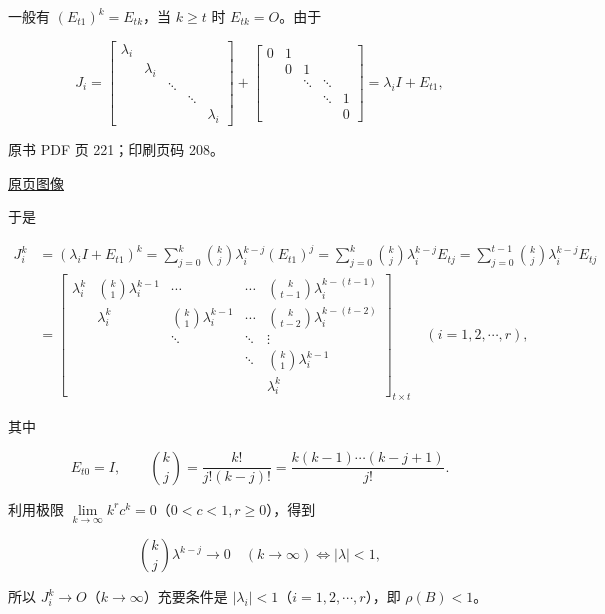 一般有 \((E_{t1})^k=E_{tk}\)，当 \(k\geqslant t\) 时 \(E_{tk}=O\)。由于

\[
J_i=\begin{bmatrix}
\lambda_i&&&&\\
&\lambda_i&&&\\
&&\ddots&&\\
&&&\ddots&\\
&&&&\lambda_i
\end{bmatrix}
+\begin{bmatrix}
0&1&&&\\
&0&1&&\\
&&\ddots&\ddots&\\
&&&\ddots&1\\
&&&&0
\end{bmatrix}
=\lambda_i I+E_{t1},
\]

\clearpage

原书 PDF 页 221；印刷页码 208。

\href{source-images/pdf-221.jpeg}{原页图像}

于是

\[
\begin{aligned}
J_i^k&=(\lambda_i I+E_{t1})^k
=\sum_{j=0}^k\binom{k}{j}\lambda_i^{k-j}(E_{t1})^j
=\sum_{j=0}^k\binom{k}{j}\lambda_i^{k-j}E_{tj}
=\sum_{j=0}^{t-1}\binom{k}{j}\lambda_i^{k-j}E_{tj}\\[6pt]
&=\begin{bmatrix}
\lambda_i^k&\binom{k}{1}\lambda_i^{k-1}&\cdots&\cdots&\binom{k}{t-1}\lambda_i^{k-(t-1)}\\[5pt]
&\lambda_i^k&\binom{k}{1}\lambda_i^{k-1}&\cdots&\binom{k}{t-2}\lambda_i^{k-(t-2)}\\[5pt]
&&\ddots&\ddots&\vdots\\[5pt]
&&&\ddots&\binom{k}{1}\lambda_i^{k-1}\\[5pt]
&&&&\lambda_i^k
\end{bmatrix}_{t\times t}\quad(i=1,2,\cdots,r),
\end{aligned}
\]

其中

\[
E_{t0}=I,\qquad\binom{k}{j}=\frac{k!}{j!(k-j)!}=\frac{k(k-1)\cdots(k-j+1)}{j!}.
\]

利用极限 \(\lim\limits_{k\to\infty}k^r c^k=0\)（\(0<c<1,r\geqslant0\)），得到

\[
\binom{k}{j}\lambda^{k-j}\to0\quad(k\to\infty)\iff|\lambda|<1,
\]

所以 \(J_i^k\to O\)（\(k\to\infty\)）充要条件是 \(|\lambda_i|<1\)（\(i=1,2,\cdots,r\)），即 \(\rho(B)<1\)。

